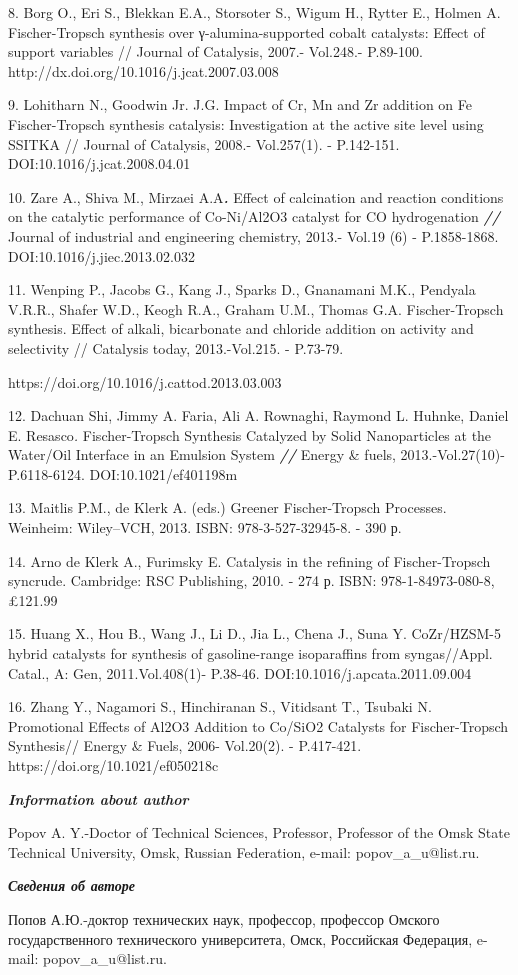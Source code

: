 8. Borg O., Eri S., Blekkan E.A., Storsoter S., Wigum H., Rytter E.,
Holmen A. Fischer-Tropsch synthesis over γ-alumina-supported cobalt
catalysts: Effect of support variables // Journal of Catalysis, 2007.-
Vol.248.- P.89-100. http://dx.doi.org/10.1016/j.jcat.2007.03.008

9. Lohitharn N., Goodwin Jr. J.G. Impact of Cr, Mn and Zr addition on Fe
Fischer-Tropsch synthesis catalysis: Investigation at the active site
level using SSITKA // Journal of Catalysis, 2008.- Vol.257(1). -
P.142-151. DOI:10.1016/j.jcat.2008.04.01

10. Zare A., Shiva M., Mirzaei A.A\emph{{\bfseries .}} Effect of
calcination and reaction conditions on the catalytic performance of
Co-Ni/Al2O3 catalyst for CO hydrogenation \emph{{\bfseries //}} Journal of
industrial and engineering chemistry, 2013.- Vol.19 (6) - P.1858-1868.
DOI:10.1016/j.jiec.2013.02.032

11. Wenping P., Jacobs G., Kang J., Sparks D., Gnanamani M.K., Pendyala
V.R.R., Shafer W.D., Keogh R.A., Graham U.M., Thomas G.A.
Fischer-Tropsch synthesis. Effect of alkali, bicarbonate and chloride
addition on activity and selectivity // Catalysis today, 2013.-Vol.215.
- P.73-79.

https://doi.org/10.1016/j.cattod.2013.03.003

12. Dachuan Shi, Jimmy A. Faria, Ali A. Rownaghi, Raymond L. Huhnke,
Daniel E. Resasco\emph{.} Fischer-Tropsch Synthesis Catalyzed by Solid
Nanoparticles at the Water/Oil Interface in an Emulsion System
\emph{{\bfseries //}} Energy \& fuels, 2013.-Vol.27(10)- P.6118-6124.
DOI:10.1021/ef401198m

13. Maitlis P.M., de Klerk A. (eds.) Greener Fischer-Tropsch Processes.
Weinheim: Wiley--VCH, 2013. ISBN: 978-3-527-32945-8. - 390 р.

14. Arno de Klerk A., Furimsky E. Catalysis in the refining of
Fischer-Tropsch syncrude. Cambridge: RSC Publishing, 2010. - 274 р.
ISBN: 978-1-84973-080-8, £121.99

15. Huang X., Hou B., Wang J., Li D., Jia L., Chena J., Suna Y.
CoZr/HZSM-5 hybrid catalysts for synthesis of gasoline-range
isoparaffins from syngas//Appl. Catal., A: Gen, 2011.Vol.408(1)-
P.38-46. DOI:10.1016/j.apcata.2011.09.004

16. Zhang Y., Nagamori S., Hinchiranan S., Vitidsant T., Tsubaki N.
Promotional Effects of Al2O3 Addition to Co/SiO2 Catalysts for
Fischer-Tropsch Synthesis// Energy \& Fuels, 2006- Vol.20(2). -
P.417-421. https://doi.org/10.1021/ef050218c

\emph{{\bfseries Information about author}}

Popov A. Y.-Doctor of Technical Sciences, Professor, Professor of the
Omsk State Technical University, Omsk, Russian Federation, e-mail:
popov\_a\_u@list.ru.

\emph{{\bfseries Сведения об авторе}}

Попов А.Ю.-доктор технических наук, профессор, профессор Омского
государственного технического университета, Омск, Российская Федерация,
e-mail: popov\_a\_u@list.ru.

